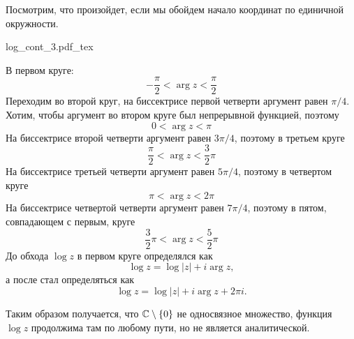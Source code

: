 \documentclass[main]{subfiles}
\begin{document}
\begin{example}
    Посмотрим, что произойдет, если мы обойдем начало координат по единичной окружности.
    \begin{center}
        {log_cont_3.pdf_tex}
    \end{center}
    В первом круге:
    \[- \frac{\pi}{2} < \arg z < \frac{\pi}{2}\]
    Переходим во второй круг, на биссектрисе первой четверти аргумент равен $\pi /4$.
    Хотим, чтобы аргумент во втором круге был непрерывной функцией, поэтому
    \[0 < \arg z < \pi\]
    На биссектрисе второй четверти аргумент равен $3 \pi/4$, поэтому в третьем круге
    \[ \frac{\pi}{2} < \arg z < \frac{3}{2} \pi\]
    На биссектрисе третьей четверти аргумент равен $5 \pi/4$, поэтому в четвертом круге
    \[\pi < \arg z < 2 \pi\]
    На биссектрисе  четвертой четверти аргумент равен $7 \pi/4$, поэтому в пятом, совпадающем с первым, круге
    \[ \frac{3}{2}\pi < \arg z < \frac{5}{2} \pi\]
    До обхода $\log z$ в первом круге определялся как
    \[\log z = \log |z| + i \arg z,\]
    а после стал определяться как
    \[\log z = \log |z| + i \arg z + 2 \pi i.\]

    Таким образом получается, что $\mathbb{C} \setminus \{0\}$ не односвязное множество, функция $\log z$ продолжима там по любому пути, но не является аналитической.
\end{example}
\end{document}
